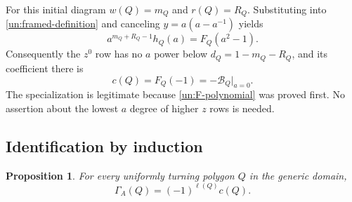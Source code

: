 \documentclass[11pt,letterpaper]{article}
\numberwithin{equation}{section}
\newtheorem{proposition}[theorem]{Proposition}
\theoremstyle{definition}
\theoremstyle{remark}
\begin{document}
For this initial diagram $w(Q)=m_Q$ and $r(Q)=R_Q$.  Substituting into
\eqref{un:framed-definition} and canceling $y=a(a-a^{-1})$ yields
\begin{equation}
 a^{m_Q+R_Q-1}h_Q(a)=F_Q(a^2-1).
 \label{un:row-polynomial}
\end{equation}
Consequently the $z^0$ row has no $a$ power below
$d_Q=1-m_Q-R_Q$, and its coefficient there is
\begin{equation}
 c(Q)=F_Q(-1)=-\mathcal B_Q\big|_{a=0}.
 \label{un:corner-evaluation}
\end{equation}
The specialization is legitimate because \eqref{un:F-polynomial} was
proved first.  No assertion about the lowest $a$ degree of higher
$z$ rows is needed.

\subsection{Identification by induction}
\label{un:identification}

\begin{proposition}
\label{un:uniform-proposition}
For every uniformly turning polygon $Q$ in the generic domain,
\begin{equation}
 \Gamma_A(Q)=(-1)^{\ell(Q)}c(Q).
 \label{un:uniform-result}
\end{equation}
\end{proposition}
\end{document}
